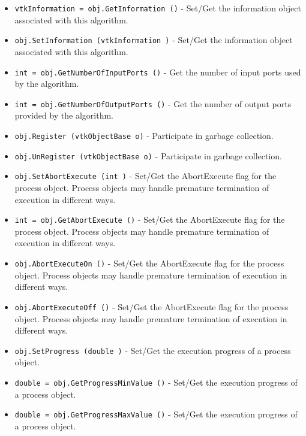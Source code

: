 \begin{itemize}
\item  \verb|vtkInformation = obj.GetInformation ()| -  Set/Get the information object associated with this algorithm.

\item  \verb|obj.SetInformation (vtkInformation )| -  Set/Get the information object associated with this algorithm.

\item  \verb|int = obj.GetNumberOfInputPorts ()| -  Get the number of input ports used by the algorithm.

\item  \verb|int = obj.GetNumberOfOutputPorts ()| -  Get the number of output ports provided by the algorithm.

\item  \verb|obj.Register (vtkObjectBase o)| -  Participate in garbage collection.

\item  \verb|obj.UnRegister (vtkObjectBase o)| -  Participate in garbage collection.

\item  \verb|obj.SetAbortExecute (int )| -  Set/Get the AbortExecute flag for the process object. Process objects
 may handle premature termination of execution in different ways.

\item  \verb|int = obj.GetAbortExecute ()| -  Set/Get the AbortExecute flag for the process object. Process objects
 may handle premature termination of execution in different ways.

\item  \verb|obj.AbortExecuteOn ()| -  Set/Get the AbortExecute flag for the process object. Process objects
 may handle premature termination of execution in different ways.

\item  \verb|obj.AbortExecuteOff ()| -  Set/Get the AbortExecute flag for the process object. Process objects
 may handle premature termination of execution in different ways.

\item  \verb|obj.SetProgress (double )| -  Set/Get the execution progress of a process object.

\item  \verb|double = obj.GetProgressMinValue ()| -  Set/Get the execution progress of a process object.

\item  \verb|double = obj.GetProgressMaxValue ()| -  Set/Get the execution progress of a process object.


\end{itemize}
